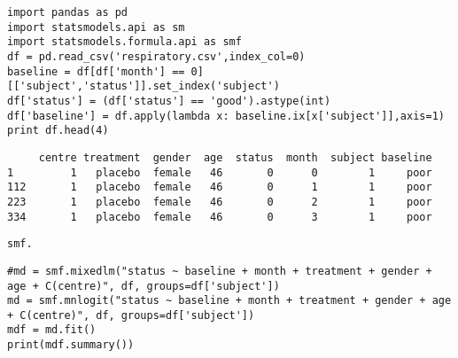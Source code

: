 \documentclass[12pt,fleqn]{article}\usepackage{../common}
\begin{document}
\begin{verbatim}
import pandas as pd
import statsmodels.api as sm
import statsmodels.formula.api as smf
df = pd.read_csv('respiratory.csv',index_col=0)
baseline = df[df['month'] == 0][['subject','status']].set_index('subject')
df['status'] = (df['status'] == 'good').astype(int)
df['baseline'] = df.apply(lambda x: baseline.ix[x['subject']],axis=1)
print df.head(4)
\end{verbatim}

\begin{verbatim}
     centre treatment  gender  age  status  month  subject baseline
1         1   placebo  female   46       0      0        1     poor
112       1   placebo  female   46       0      1        1     poor
223       1   placebo  female   46       0      2        1     poor
334       1   placebo  female   46       0      3        1     poor
\end{verbatim}

\begin{verbatim}
smf.
\end{verbatim}



\begin{verbatim}
#md = smf.mixedlm("status ~ baseline + month + treatment + gender + age + C(centre)", df, groups=df['subject'])
md = smf.mnlogit("status ~ baseline + month + treatment + gender + age + C(centre)", df, groups=df['subject'])
mdf = md.fit()
print(mdf.summary())
\end{verbatim}
\end{document}
